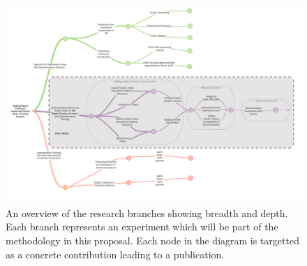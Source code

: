 \documentclass{article}
\begin{document}
\begin{landscape}
\begin{figure}[h]
\centering
 \includegraphics[width=\columnwidth\textheight]{figures/branches.png}
    \caption{An overview of the research branches showing breadth and depth. Each branch represents an experiment which will be part of the methodology in this proposal. Each node in the diagram is targetted  as a concrete contribution leading to a publication.
 }\label{fig:branches}
\end{figure}
\end{landscape}
\end{document}
